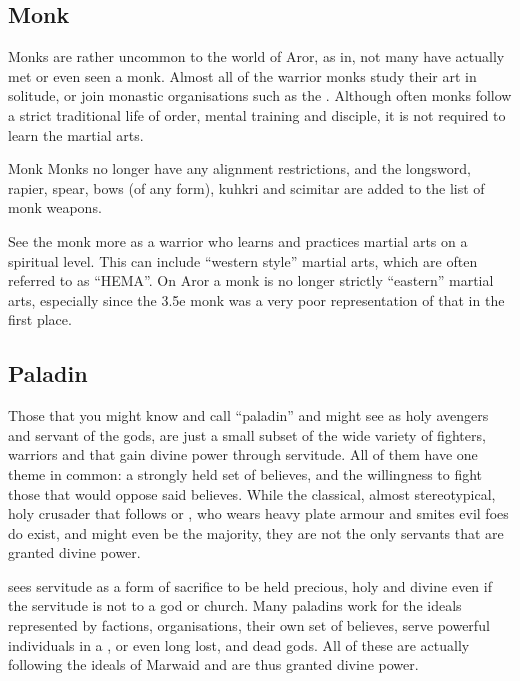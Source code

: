 \subsection{Monk}
\label{sec:Monk}

Monks are rather uncommon to the world of Aror, as in, not many have actually
met or even seen a monk. Almost all of the warrior monks study their art in
solitude, or join monastic organisations such as the .
Although often monks follow a strict traditional life of order, mental training
and disciple, it is not required to learn the martial arts.

\begin{35e}{Monk}
  Monks no longer have any alignment restrictions, and the longsword, rapier,
  spear, bows (of any form), kuhkri and scimitar are added to the list of monk
  weapons.
\end{35e}

\begin{note}
  See the monk more as a warrior who learns and practices martial arts on a
  spiritual level. This can include ``western style'' martial arts, which are
  often referred to as ``HEMA''. On Aror a monk is no longer strictly
  ``eastern'' martial arts, especially since the 3.5e monk was a very poor
  representation of that in the first place.
\end{note}

\subsection{Paladin}
\label{sec:Paladin}

Those that you might know and call ``paladin'' and might see as holy avengers
and servant of the gods, are just a small subset of the wide variety of
fighters, warriors and that gain divine power through servitude. All of them
have one theme in common: a strongly held set of believes, and the willingness
to fight those that would oppose said believes. While the classical, almost
stereotypical, holy crusader that follows  or
, who wears heavy plate armour and smites evil foes do
exist, and might even be the majority, they are not the only servants that are
granted divine power.

 sees servitude as a form of sacrifice to be held
precious, holy and divine even if the servitude is not to a god or church. Many
paladins work for the ideals represented by factions, organisations, their own
set of believes, serve powerful individuals in a , or
even long lost, and dead gods. All of these are actually following the ideals
of Marwaid and are thus granted divine power.

